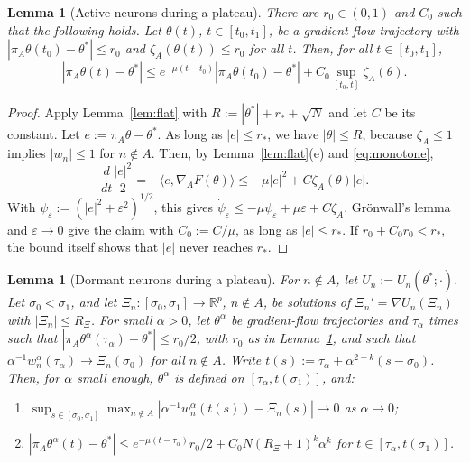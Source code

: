 \documentclass[11pt]{article}
\newtheorem{lemma}[theorem]{Lemma}
\theoremstyle{definition}
\theoremstyle{remark}
\numberwithin{equation}{section}
\newcommand{\R}{\mathbb{R}}
\newcommand{\eps}{\varepsilon}
\newcommand{\ip}[2]{\langle #1,#2\rangle}
\begin{document}
\begin{lemma}[Active neurons during a plateau]\label{lem:plateau}
There are $r_0\in(0,1)$ and $C_0$ such that the following holds. Let $\theta(t)$, $t\in[t_0,t_1]$, be a gradient-flow trajectory with $|\pi_A\theta(t_0)-\theta^*|\le r_0$ and $\zeta_A(\theta(t))\le r_0$ for all $t$. Then, for all $t\in[t_0,t_1]$,
\[
|\pi_A\theta(t)-\theta^*|\le e^{-\mu(t-t_0)}|\pi_A\theta(t_0)-\theta^*|+C_0\sup_{[t_0,t]}\zeta_A(\theta).
\]
\end{lemma}

\begin{proof}
Apply Lemma~\ref{lem:flat} with $R:=|\theta^*|+r_*+\sqrt N$ and let $C$ be its constant. Let $e:=\pi_A\theta-\theta^*$. As long as $|e|\le r_*$, we have $|\theta|\le R$, because $\zeta_A\le1$ implies $|w_n|\le1$ for $n\notin A$. Then, by Lemma~\ref{lem:flat}(e) and \eqref{eq:monotone},
\[
\frac{d}{dt}\frac{|e|^2}2=-\ip{e}{\nabla_AF(\theta)}\le-\mu|e|^2+C\zeta_A(\theta)|e|.
\]
With $\psi_\eps:=(|e|^2+\eps^2)^{1/2}$, this gives $\dot\psi_\eps\le-\mu\psi_\eps+\mu\eps+C\zeta_A$. Grönwall's lemma and $\eps\to0$ give the claim with $C_0:=C/\mu$, as long as $|e|\le r_*$. If $r_0+C_0r_0<r_*$, the bound itself shows that $|e|$ never reaches $r_*$.
\end{proof}

\begin{lemma}[Dormant neurons during a plateau]\label{lem:dormant}
For $n\notin A$, let $U_n:=U_n(\theta^*;\cdot)$. Let $\sigma_0<\sigma_1$, and let $\Xi_n\colon[\sigma_0,\sigma_1]\to\R^p$, $n\notin A$, be solutions of $\Xi_n'=\nabla U_n(\Xi_n)$ with $|\Xi_n|\le R_\Xi$. For small $\alpha>0$, let $\theta^\alpha$ be gradient-flow trajectories and $\tau_\alpha$ times such that $|\pi_A\theta^\alpha(\tau_\alpha)-\theta^*|\le r_0/2$, with $r_0$ as in Lemma~\ref{lem:plateau}, and such that $\alpha^{-1}w^\alpha_n(\tau_\alpha)\to\Xi_n(\sigma_0)$ for all $n\notin A$. Write $t(s):=\tau_\alpha+\alpha^{2-k}(s-\sigma_0)$. Then, for $\alpha$ small enough, $\theta^\alpha$ is defined on $[\tau_\alpha,t(\sigma_1)]$, and:
\begin{enumerate}[label=\textup{(\alph*)}]
\item $\sup_{s\in[\sigma_0,\sigma_1]}\max_{n\notin A}|\alpha^{-1}w_n^\alpha(t(s))-\Xi_n(s)|\to0$ as $\alpha\to0$;
\item $|\pi_A\theta^\alpha(t)-\theta^*|\le e^{-\mu(t-\tau_\alpha)}r_0/2+C_0N(R_\Xi+1)^k\alpha^k$ for $t\in[\tau_\alpha,t(\sigma_1)]$.
\end{enumerate}
\end{lemma}
\end{document}
